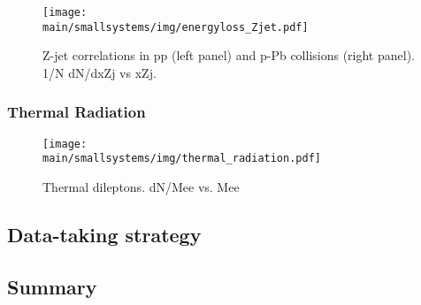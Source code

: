 \documentclass[../report.tex]{subfiles}
\providecommand{\main}{..}
\begin{document}
\begin{figure}[ht]
\centering
\texttt{[image: \\main/smallsystems/img/energyloss\_Zjet.pdf]}
\caption{Z-jet correlations in pp (left panel) and p-Pb collisions (right panel). 1/N dN/dxZj vs xZj.}
\label{fig:smallsystems_energyloss_Zjet}
\end{figure}

\subsubsection{Thermal Radiation}

\begin{figure}[ht]
\centering
\texttt{[image: \\main/smallsystems/img/thermal\_radiation.pdf]}
\caption{Thermal dileptons. dN/Mee vs. Mee}
\label{fig:smallsystems_thermal_radition}
\end{figure}

\subsection{Data-taking strategy}


\subsection{Summary}
\end{document}
